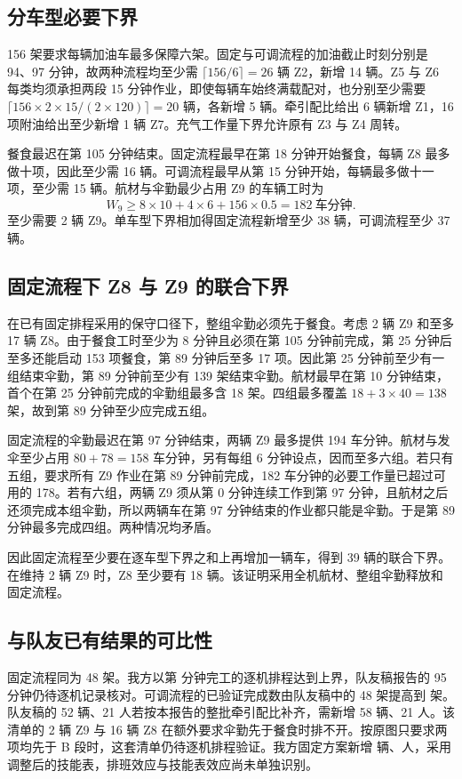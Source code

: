 \documentclass[UTF8,12pt,a4paper,fontset=none]{ctexart}
\begin{document}
\subsection{分车型必要下界}
156 架要求每辆加油车最多保障六架。固定与可调流程的加油截止时刻分别是 94、97 分钟，故两种流程均至少需 $\lceil156/6\rceil=26$ 辆 Z2，新增 14 辆。Z5 与 Z6 每类均须承担两段 15 分钟作业，即使每辆车始终满载配对，也分别至少需要 $\lceil156\times 2\times15/(2\times120)\rceil=20$ 辆，各新增 5 辆。牵引配比给出 6 辆新增 Z1，16 项附油给出至少新增 1 辆 Z7。充气工作量下界允许原有 Z3 与 Z4 周转。
\par 餐食最迟在第 105 分钟结束。固定流程最早在第 18 分钟开始餐食，每辆 Z8 最多做十项，因此至少需 16 辆。可调流程最早从第 15 分钟开始，每辆最多做十一项，至少需 15 辆。航材与伞勤最少占用 Z9 的车辆工时为
\begin{equation}
W_9\ge 8\times10+4\times6+156\times0.5=182\ \text{车分钟}.
\end{equation}
至少需要 2 辆 Z9。单车型下界相加得固定流程新增至少 38 辆，可调流程至少 37 辆。

\subsection{固定流程下 Z8 与 Z9 的联合下界}
在已有固定排程采用的保守口径下，整组伞勤必须先于餐食。考虑 2 辆 Z9 和至多 17 辆 Z8。由于餐食工时至少为 8 分钟且必须在第 105 分钟前完成，第 25 分钟后至多还能启动 153 项餐食，第 89 分钟后至多 17 项。因此第 25 分钟前至少有一组结束伞勤，第 89 分钟前至少有 139 架结束伞勤。航材最早在第 10 分钟结束，首个在第 25 分钟前完成的伞勤组最多含 18 架。四组最多覆盖 $18+3\times40=138$ 架，故到第 89 分钟至少应完成五组。
\par 固定流程的伞勤最迟在第 97 分钟结束，两辆 Z9 最多提供 194 车分钟。航材与发伞至少占用 $80+78=158$ 车分钟，另有每组 6 分钟设点，因而至多六组。若只有五组，要求所有 Z9 作业在第 89 分钟前完成，182 车分钟的必要工作量已超过可用的 178。若有六组，两辆 Z9 须从第 0 分钟连续工作到第 97 分钟，且航材之后还须完成本组伞勤，所以两辆车在第 97 分钟结束的作业都只能是伞勤。于是第 89 分钟最多完成四组。两种情况均矛盾。
\par 因此固定流程至少要在逐车型下界之和上再增加一辆车，得到 39 辆的联合下界。在维持 2 辆 Z9 时，Z8 至少要有 18 辆。该证明采用全机航材、整组伞勤释放和固定流程。

\subsection{与队友已有结果的可比性}
固定流程同为 48 架。我方以第 \FixedShortLast 分钟完工的逐机排程达到上界，队友稿报告的 95 分钟仍待逐机记录核对。可调流程的已验证完成数由队友稿中的 48 架提高到 \FlexShortAircraft 架。队友稿的 52 辆、21 人若按本报告的整批牵引配比补齐，需新增 58 辆、21 人。该清单的 2 辆 Z9 与 16 辆 Z8 在额外要求伞勤先于餐食时排不开。按原图只要求两项均先于 B 段时，这套清单仍待逐机排程验证。我方固定方案新增 \FixedLongCars 辆、\FixedLongPeople 人，采用调整后的技能表，排班效应与技能表效应尚未单独识别。
\end{document}
